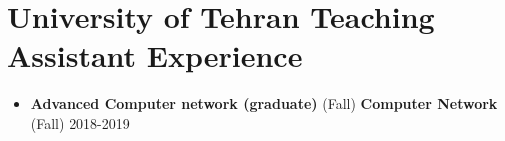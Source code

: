 \documentclass[a4paper,10pt]{article} %
\begin{document}
\color{blue}
\section{University of Tehran Teaching Assistant Experience}
\color{Black}
\begin{itemize}
	
	\item	
		\textbf{Advanced Computer network (graduate)} (Fall) 
		\textbf{Computer Network} (Fall)
		\hfill {2018-2019}\\
	

\end{itemize}
\end{document}

